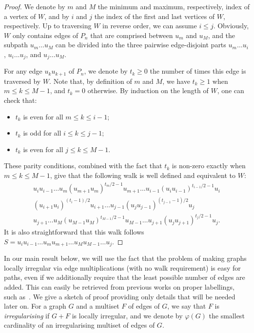 \documentclass[a4paper,11pt,dvipsnames]{elsarticle}
\begin{document}
\begin{proof}
We denote by $m$ and $M$ the minimum and maximum, respectively, index of a vertex of $W$, and by $i$ and $j$ the index of the first and last vertices of $W$, respectively. Up to traversing $W$ in reverse order, we can assume $i \leq j$.
Obviously, $W$ only contains edges of $P_n$ that are comprised between $u_m$ and $u_M$, and the subpath $u_m\dots u_M$ can be divided into the three pairwise edge-disjoint parts $u_m\dots u_i$, $u_i\dots u_j$, and $u_j\dots u_M$.
 
For any edge $u_{k}u_{k+1}$ of $P_n$, we denote by $t_k \geq 0$ the number of times this edge is traversed by $W$. Note that, by definition of $m$ and $M$, we have $t_k \geq 1$ when $m \leq k \leq M-1$, and $t_k=0$ otherwise. By induction on the length of $W$, one can check that:

\begin{itemize}
    \item $t_k$ is even for all $m\le k\le i-1$;
    \item $t_k$ is odd for all $i\le k\le j-1$;
    \item $t_k$ is even for all $j\le k\le M-1$.
\end{itemize}

\noindent These parity conditions, combined with the fact that $t_k$ is non-zero exactly when $m\le k\le M-1$, give that the following walk
is well defined and equivalent to $W$:
\begin{align*}      
    u_iu_{i-1}\dots u_m(u_{m+1}u_m)^{t_m/2-1}u_{m+1}\dots u_{i-1}(u_iu_{i-1})^{t_{i-1}/2-1}u_i\\
    (u_{i+1}u_i)^{(t_i-1)/2}u_{i+1}\dots u_{j-1}(u_ju_{j-1})^{(t_{j-1}-1)/2}u_j\\
    u_{j+1}\dots u_M(u_{M-1}u_M)^{t_{M-1}/2-1}u_{M-1}\dots u_{j+1}(u_ju_{j+1})^{t_j/2-1}u_j.
\end{align*}
It is also straightforward that this walk follows $S=u_iu_{i-1}\dots u_mu_{m+1}\dots u_Mu_{M-1}\dots u_{j}$.
\end{proof}

In our main result below, we will use the fact that the problem of making graphs locally irregular via edge multiplications (with no walk requirement) is easy for paths, even if we additionally require that the least possible number of edges are added. This can easily be retrieved from previous works on proper labellings, such as~\cite{BFN22,CLWY11}. We give a sketch of proof providing only details that will be needed later on. For a graph $G$ and a multiset $F$ of edges of $G$, we say that $F$ is \textit{irregularising} if $G+F$ is locally irregular, and we denote by $\varphi(G)$ the smallest cardinality of an irregularising multiset of edges of $G$.
\end{document}
